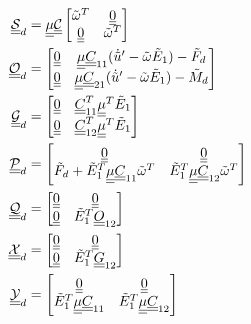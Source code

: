 \begin{align}
    \label{DampingSd}
    \underline{\underline{\mathcal{S}}}_d &= 
    \underline{\underline{\mu}} \underline{\underline{\mathcal{C}}} \begin{bmatrix}
    \tilde{\omega}^T & \underline{\underline{0}} \\
    \underline{\underline{0}} & \tilde{\omega}^T
    \end{bmatrix} \\
    \label{DampingOd}
    \underline{\underline{\mathcal{O}}}_d &= 
    \begin{bmatrix}
    \underline{\underline{0}} & \underline{\underline{\mu}} \underline{\underline{C}}_{11} (\dot{\tilde{u}}^\prime - \tilde{\omega} \tilde{E}_1) - \tilde{F}_d \\
    \underline{\underline{0}} &\underline{\underline{\mu}} \underline{\underline{C}}_{21} (\dot{\tilde{u}}^\prime - \tilde{\omega} \tilde{E}_1) - \tilde{M}_d
    \end{bmatrix} \\
    \label{DampingGd}
    \underline{\underline{\mathcal{G}}}_d &= 
    \begin{bmatrix}
    \underline{\underline{0}} & \underline{\underline{C}}_{11}^T \underline{\underline{\mu}}^T \tilde{E}_1 \\
    \underline{\underline{0}} & \underline{\underline{C}}_{12}^T \underline{\underline{\mu}}^T \tilde{E}_1 
    \end{bmatrix} \\
    \label{DampingPd}
    \underline{\underline{\mathcal{P}}}_d &= 
    \begin{bmatrix}
    \underline{\underline{0}} & \underline{\underline{0}}  \\
    \tilde{F}_d + \tilde{E}_1^T \underline{\underline{\mu}} \underline{\underline{C}}_{11} \tilde{\omega}^T &  \tilde{E}_1^T \underline{\underline{\mu}} \underline{\underline{C}}_{12} \tilde{\omega}^T 
    \end{bmatrix} \\
    \label{DampingQd}
    \underline{\underline{\mathcal{Q}}}_d &= 
    \begin{bmatrix}
    \underline{\underline{0}} & \underline{\underline{0}}  \\
    \underline{\underline{0}} &  \tilde{E}_1^T \underline{\underline{O}}_{12}
    \end{bmatrix} \\
    \label{DampingXd}
    \underline{\underline{\mathcal{X}}}_d &= 
    \begin{bmatrix}
    \underline{\underline{0}} & \underline{\underline{0}}  \\
     \underline{\underline{0}} &  \tilde{E}_1^T \underline{\underline{G}}_{12}
    \end{bmatrix} \\
    \label{DampingYd}
    \underline{\underline{\mathcal{Y}}}_d &= 
    \begin{bmatrix}
    \underline{\underline{0}} & \underline{\underline{0}}  \\
      \tilde{E}_1^T \underline{\underline{\mu}} \underline{\underline{C}}_{11} &   \tilde{E}_1^T \underline{\underline{\mu}} \underline{\underline{C}}_{12}
    \end{bmatrix} \\
\end{align}

